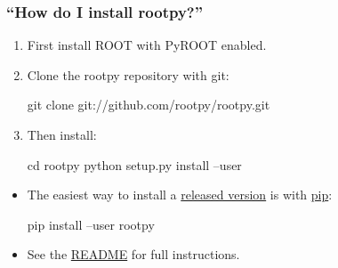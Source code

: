 \documentclass[10pt,professionalfonts,serif,usenames,dvipsnames,svgnames,table]{beamer}
\begin{document}
\begin{frame}[fragile]
    \frametitle{``How do I install rootpy?''}
    \begin{enumerate}
        \item First install ROOT with PyROOT enabled.
        \item Clone the rootpy repository with git:
\begin{pyglist}[language=bash,texcl=true,style=vim]
git clone git://github.com/rootpy/rootpy.git
\end{pyglist}
\item Then install:
\begin{pyglist}[language=bash,texcl=true,style=vim]
cd rootpy
python setup.py install --user
\end{pyglist}
\end{enumerate}
\begin{itemize}
    \item The easiest way to install a \href{https://pypi.python.org/pypi/rootpy}{released version}
        is with \href{https://pypi.python.org/pypi/pip}{pip}:
\begin{pyglist}[language=bash,texcl=true,style=vim]
pip install --user rootpy
\end{pyglist}
        \item See the
                \href{https://github.com/rootpy/rootpy/blob/master/README.rst}{README}
                for full instructions.
    \end{itemize}
\end{frame}



\end{document}
